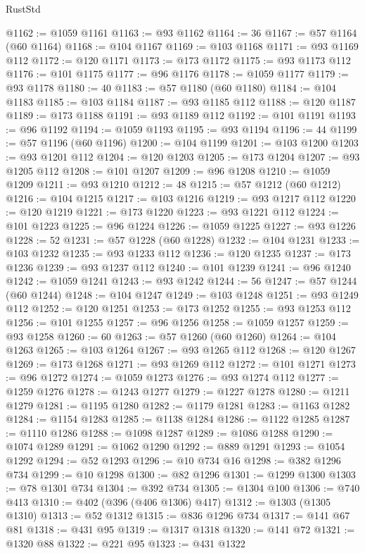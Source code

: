 \begin{lexlean}{RustStd}
\begin{coremodule}
@1162 := @1059 @1161
@1163 := @93 @1162
@1164 := 36
@1167 := @57 @1164 (@60 @1164)
@1168 := @104 @1167
@1169 := @103 @1168
@1171 := @93 @1169 @112
@1172 := @120 @1171
@1173 := @173 @1172
@1175 := @93 @1173 @112
@1176 := @101 @1175
@1177 := @96 @1176
@1178 := @1059 @1177
@1179 := @93 @1178
@1180 := 40
@1183 := @57 @1180 (@60 @1180)
@1184 := @104 @1183
@1185 := @103 @1184
@1187 := @93 @1185 @112
@1188 := @120 @1187
@1189 := @173 @1188
@1191 := @93 @1189 @112
@1192 := @101 @1191
@1193 := @96 @1192
@1194 := @1059 @1193
@1195 := @93 @1194
@1196 := 44
@1199 := @57 @1196 (@60 @1196)
@1200 := @104 @1199
@1201 := @103 @1200
@1203 := @93 @1201 @112
@1204 := @120 @1203
@1205 := @173 @1204
@1207 := @93 @1205 @112
@1208 := @101 @1207
@1209 := @96 @1208
@1210 := @1059 @1209
@1211 := @93 @1210
@1212 := 48
@1215 := @57 @1212 (@60 @1212)
@1216 := @104 @1215
@1217 := @103 @1216
@1219 := @93 @1217 @112
@1220 := @120 @1219
@1221 := @173 @1220
@1223 := @93 @1221 @112
@1224 := @101 @1223
@1225 := @96 @1224
@1226 := @1059 @1225
@1227 := @93 @1226
@1228 := 52
@1231 := @57 @1228 (@60 @1228)
@1232 := @104 @1231
@1233 := @103 @1232
@1235 := @93 @1233 @112
@1236 := @120 @1235
@1237 := @173 @1236
@1239 := @93 @1237 @112
@1240 := @101 @1239
@1241 := @96 @1240
@1242 := @1059 @1241
@1243 := @93 @1242
@1244 := 56
@1247 := @57 @1244 (@60 @1244)
@1248 := @104 @1247
@1249 := @103 @1248
@1251 := @93 @1249 @112
@1252 := @120 @1251
@1253 := @173 @1252
@1255 := @93 @1253 @112
@1256 := @101 @1255
@1257 := @96 @1256
@1258 := @1059 @1257
@1259 := @93 @1258
@1260 := 60
@1263 := @57 @1260 (@60 @1260)
@1264 := @104 @1263
@1265 := @103 @1264
@1267 := @93 @1265 @112
@1268 := @120 @1267
@1269 := @173 @1268
@1271 := @93 @1269 @112
@1272 := @101 @1271
@1273 := @96 @1272
@1274 := @1059 @1273
@1276 := @93 @1274 @112
@1277 := @1259 @1276
@1278 := @1243 @1277
@1279 := @1227 @1278
@1280 := @1211 @1279
@1281 := @1195 @1280
@1282 := @1179 @1281
@1283 := @1163 @1282
@1284 := @1154 @1283
@1285 := @1138 @1284
@1286 := @1122 @1285
@1287 := @1110 @1286
@1288 := @1098 @1287
@1289 := @1086 @1288
@1290 := @1074 @1289
@1291 := @1062 @1290
@1292 := @889 @1291
@1293 := @1054 @1292
@1294 := @52 @1293
@1296 := @10 @734 @16
@1298 := @382 @1296 @734
@1299 := @10 @1298
@1300 := @82 @1296
@1301 := @1299 @1300
@1303 := @78 @1301 @734
@1304 := @392 @734
@1305 := @1304 @100
@1306 := @740 @413
@1310 := @402 (@396 (@406 @1306) @417)
@1312 := @1303 (@1305 @1310)
@1313 := @52 @1312
@1315 := @836 @1296 @734
@1317 := @141 @67 @81
@1318 := @431 @95
@1319 := @1317 @1318
@1320 := @141 @72
@1321 := @1320 @88
@1322 := @221 @95
@1323 := @431 @1322

\end{coremodule}
\end{lexlean}
